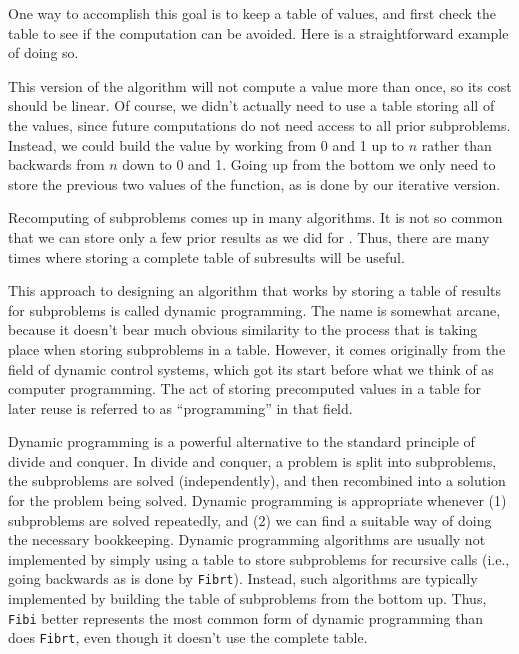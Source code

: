 One way to accomplish this goal is to keep a table of values, and
first check the table to see if the computation can be avoided.
Here is a straightforward example of doing so.


This version of the algorithm will not compute a value more than once,
so its cost should be linear.
Of course, we didn't actually need to use a table storing all of the
values, since future computations do not need access to all prior
subproblems.
Instead, we could build the value by working from 0 and 1 up to $n$
rather than backwards from $n$ down to 0 and 1.
Going up from the bottom we only need to store the previous two values
of the function, as is done by our iterative version.


Recomputing of subproblems comes up in many algorithms.
It is not so common that we can store only a few prior results as we
did for .
Thus, there are many times where storing a complete table of
subresults will be useful.

This approach to designing an algorithm that works by storing a table
of results for subproblems is called dynamic programming.
The name is somewhat arcane, because it doesn't bear much obvious
similarity to the process that is taking place when storing subproblems
in a table.
However, it comes originally from the field of dynamic control
systems, which got its start before what we think of as computer
programming.
The act of storing precomputed values in a table for later reuse is
referred to as ``programming'' in that field.

Dynamic programming is a powerful alternative to the standard
principle of divide and conquer.
In divide and conquer, a problem is split into subproblems, the
subproblems are solved (independently), and then recombined into a
solution for the problem being solved.
Dynamic programming is appropriate whenever
(1) subproblems are solved repeatedly,
and (2) we can find a suitable way of doing the necessary
bookkeeping.
Dynamic programming algorithms are usually not implemented by simply
using a table to store subproblems for recursive calls (i.e., going
backwards as is done by \texttt{Fibrt}).
Instead, such algorithms are typically implemented by building the
table of subproblems from the bottom up.
Thus, \texttt{Fibi} better represents the most common form of dynamic
programming than does \texttt{Fibrt}, even though it doesn't use the
complete table.


